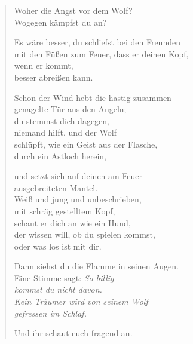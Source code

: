 
\cleartoverso


\begin{verse}

Woher die Angst vor dem Wolf?\\
Wogegen kämpfst du an?

Es wäre besser, du schliefst bei den Freunden\\
mit den Füßen zum Feuer, dass er deinen Kopf,\\
wenn er kommt,\\
besser abreißen kann.

Schon der Wind hebt die hastig zusammen-\\
genagelte Tür aus den Angeln;\\
du stemmst dich dagegen,\\
niemand hilft, und der Wolf\\
schlüpft, wie ein Geist aus der Flasche,\\
durch ein Astloch herein,

und setzt sich auf deinen am Feuer\\
ausgebreiteten Mantel.\\
Weiß und jung und unbeschrieben,\\
mit schräg gestelltem Kopf,\\
schaut er dich an wie ein Hund,\\
der wissen will, ob du spielen kommst,\\
oder was los ist mit dir.

\clearpage

Dann siehst du die Flamme in seinen Augen.\\
Eine Stimme sagt: {\itshape So billig\\
kommst du nicht davon.\\
Kein Träumer wird von seinem Wolf\\
gefressen im Schlaf.}

Und ihr schaut euch fragend an.

\end{verse}

\clearpage


